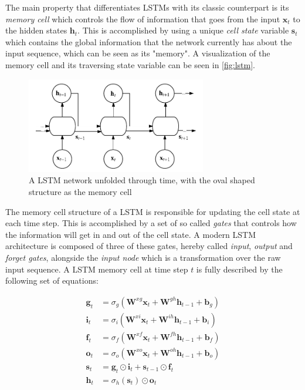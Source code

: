 \documentclass{kththesis}
\begin{document}
The main property that differentiates LSTMs with its classic counterpart is its \emph{memory cell} which controls the flow of information that goes from the input $\mathbf{x}_t$ to the hidden states $\mathbf{h}_t$. This is accomplished by using a unique \emph{cell state} variable $\mathbf{s}_t$ which contains the global information that the network currently has about the input sequence, which can be seen as its "memory". A visualization of the memory cell and its traversing state variable can be seen in \autoref{fig:lstm}.

\begin{figure}[h]
    \centering
    \includegraphics[width=0.7\textwidth,keepaspectratio]{figures/lstm.pdf}
    \caption{A LSTM network unfolded through time, with the oval shaped structure as the memory cell}
    \label{fig:lstm}
\end{figure}

The memory cell structure of a LSTM is responsible for updating the cell state at each time step. This is accomplished by a set of so called \emph{gates} that controls how the information will get in and out of the cell state. A modern LSTM architecture is composed of three of these gates, hereby called \emph{input}, \emph{output} and \emph{forget gates}, alongside the \emph{input node} which is a transformation over the raw input sequence. A LSTM memory cell at time step $t$ is fully described by the following set of equations:

\begin{equation}
\begin{aligned} 
\mathbf{g}_t &= \sigma_g(\mathbf{W}^{xg}\mathbf{x}_t + \mathbf{W}^{gh}\mathbf{h}_{t-1}+\mathbf{b}_g) \\ 
\mathbf{i}_t &= \sigma_i(\mathbf{W}^{xi}\mathbf{x}_t + \mathbf{W}^{ih}\mathbf{h}_{t-1}+\mathbf{b}_i) \\
\mathbf{f}_t &= \sigma_f(\mathbf{W}^{xf}\mathbf{x}_t + \mathbf{W}^{fh}\mathbf{h}_{t-1}+\mathbf{b}_f) \\
\mathbf{o}_t &= \sigma_o(\mathbf{W}^{xo}\mathbf{x}_t + \mathbf{W}^{oh}\mathbf{h}_{t-1}+\mathbf{b}_o) \\
\mathbf{s}_t &= \mathbf{g}_t \odot \mathbf{i}_t + \mathbf{s}_{t-1} \odot \mathbf{f}_t \\
\mathbf{h}_t &=  \sigma_h(\mathbf{s}_t) \odot \mathbf{o}_t
\end{aligned}
\end{equation}
\end{document}
